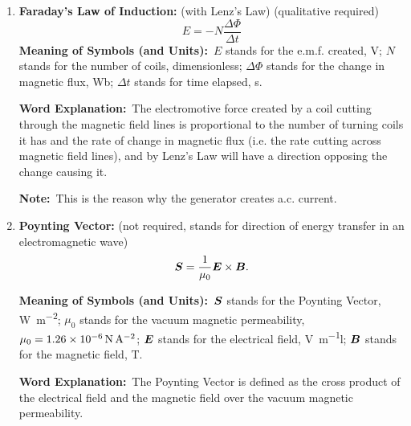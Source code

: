 \documentclass[8pt]{article}
\newcommand{\MeanSymb}{\textbf{Meaning of Symbols (and Units):}\ }
\newcommand{\WordExpl}{\textbf{Word Explanation:}\ }
\newcommand{\DeriForm}{\textbf{Derived Formulae:}\ }
\newcommand{\Note}{\textbf{Note:}\ }
\begin{document}
\begin{enumerate}
                \WordExpl The magnetic flux is the dot product of the magnetic flux density and the surface (as the name suggests).

                \DeriForm Let \(\theta\) be the angle between the surface vector and the magnetic field, we have
                \[
                    \Phi = BS \cos \theta.
                \]

                Furthermore,
                \[
                    \Phi = \iint_{\Sigma} \vect{B} \cdot \diff \vect{S}.
                \]

                \Note This will be useful for the next part: Faraday's Law of Induction.

                \item \textbf{Faraday's Law of Induction:} (with Lenz's Law) (qualitative required)
                \[
                    E = -N \frac{\Delta \Phi}{\Delta t}
                \]
                \MeanSymb \(E\) stands for the e.m.f. created, \unit{\volt}; \(N\) stands for the number of coils, dimensionless; \(\Delta \Phi\) stands for the change in magnetic flux, \unit{\weber}; \(\Delta t\) stands for time elapsed, \unit{\second}.

                \WordExpl The electromotive force created by a coil cutting through the magnetic field lines is proportional to the number of turning coils it has and the rate of change in magnetic flux (i.e. the rate cutting across magnetic field lines), and by Lenz's Law will have a direction opposing the change causing it.

                \Note This is the reason why the generator creates a.c. current.

                \item \textbf{Poynting Vector:} (not required, stands for direction of energy transfer in an electromagnetic wave)
                \[
                    \boldsymbol{S} = \frac{1}{\mu_0} \boldsymbol{E} \times \boldsymbol{B}.
                \]

                \MeanSymb \(\boldsymbol{S}\) stands for the Poynting Vector, \unit{\watt \per \metre \squared}; \(\mu_0\) stands for the vacuum magnetic permeability, \(\mu_0 = \qty{1.26 e -6}{\newton \per \ampere \squared}\); \(\boldsymbol{E}\) stands for the electrical field, \unit{\volt \per \metre}l; \(\boldsymbol{B}\) stands for the magnetic field, \unit{\tesla}.

                \WordExpl The Poynting Vector is defined as the cross product of the electrical field and the magnetic field over the vacuum magnetic permeability.


\end{enumerate}
\end{document}
